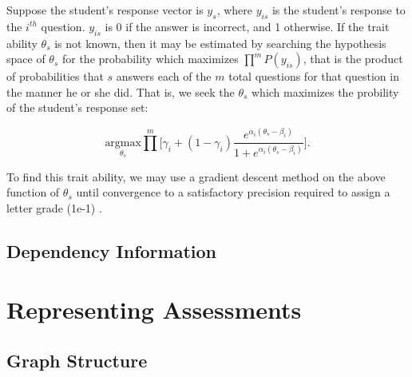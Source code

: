 Suppose the student's response vector is $y_s$, where $y_{is}$ is the student's
response to the $i^{th}$ question.  $y_{is}$ is 0 if the answer is incorrect,
and 1 otherwise.  If the trait ability $\theta_s$ is not known, then it may be
estimated by searching the hypothesis space of $\theta_s$ for the probability
which maximizes $\prod^m P(y_{is})$, that is the product of probabilities that
$s$ answers each of the $m$ total questions for that question in the manner
he or she did.  That is, we seek the $\theta_s$ which maximizes the probility
of the student's response set:

\[
 \underset{\theta_s}{\textrm{argmax}}
 \prod^m
 \Bigg[
 \gamma_i + (1-\gamma_i) 
 \frac{    e^{\alpha_{i}(\theta_{s} - \beta_{i})}}
      {1 + e^{\alpha_{i}(\theta_{s} - \beta_{i})}}
 \Bigg].
\]

To find this trait ability, we may use a gradient descent method on the above
function of $\theta_s$ until convergence to a satisfactory precision required
to assign a letter grade (1e-1) \cite{embretson2000}. 

\subsection{Dependency Information}

\section{Representing Assessments}

\subsection{Graph Structure}
